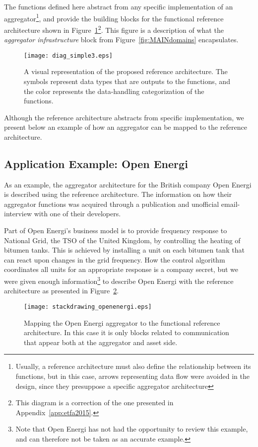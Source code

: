 The functions defined here abstract from any specific implementation of an aggregator\footnote[][-2cm]{Usually, a reference architecture must also define the relationship between its functions, but in this case, arrows representing data flow were avoided in the design, since they presuppose a specific aggregator architecture}, and provide the building blocks for the functional reference architecture shown in Figure~\ref{fig:MAINrefarch}\footnote{This diagram is a correction of the one presented in Appendix~\ref{app:etfa2015}.}. This figure is a description of what the \emph{aggregator infrastructure} block from Figure~\ref{fig:MAINdomains} encapsulates.
\begin{figure}[htbp!]
\centering
\texttt{[image: diag\_simple3.eps]}
\caption{A visual representation of the proposed reference architecture. The symbols represent data types that are outputs to the functions, and the color represents the data-handling categorization of the functions.}
\label{fig:MAINrefarch}
\end{figure}
Although the reference architecture abstracts from specific implementation, we present below an example of how an aggregator can be mapped to the reference architecture.
\subsection{Application Example: Open Energi}
As an example, the aggregator architecture for the British company Open Energi is described using the reference architecture. The information on how their aggregator functions was acquired through a publication and unofficial email-interview with one of their developers.

Part of Open Energi's business model is to provide frequency response to National Grid, the TSO of the United Kingdom, by controlling the heating of bitumen tanks. This is achieved by installing a unit on each bitumen tank that can react upon changes in the grid frequency. How the control algorithm coordinates all units for an appropriate response is a company secret, but we were given enough information\footnote{Note that Open Energi has not had the opportunity to review this example, and can therefore not be taken as an accurate example.} to describe Open Energi with the reference architecture as presented in Figure~\ref{fig:openenergirefarch}.

\begin{figure}[htb]
\centering
\texttt{[image: stackdrawing\_openenergi.eps]}
\caption{Mapping the Open Energi aggregator to the functional reference architecture. In this case it is only blocks related to communication that appear both at the aggregator and asset side.}
\label{fig:openenergirefarch}
\end{figure}

